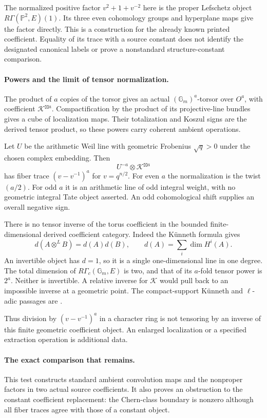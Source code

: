 The normalized positive factor \(v^2+1+v^{-2}\) here is
the proper Lefschetz object
\(R\Gamma(\mathbb P^2,E)(1)\).
Its three even cohomology groups and hyperplane maps give
the factor directly. This is a construction for the already
known printed coefficient. Equality of its trace with a
source constant does not identify the designated canonical
labels or prove a nonstandard structure-constant comparison.

\paragraph{Powers and the limit of tensor normalization.}
The product of \(a\) copies of the torsor gives an actual
\((\mathbb G_m)^a\)-torsor over \(O^a\), with coefficient
\(\mathcal K^{\boxtimes a}\).
Compactification by the product of its projective-line
bundles gives a cube of localization maps. Their totalization
and Koszul signs are the derived tensor product, so these
powers carry coherent ambient operations.

Let \(U\) be the arithmetic Weil line with geometric
Frobenius \(\sqrt q>0\) under the chosen complex embedding.
Then
\[
                   U^{-a}\otimes\mathcal K^{\boxtimes a}
\]
has fiber trace \((v-v^{-1})^a\) for \(v=q^{n/2}\).
For even \(a\) the normalization is the twist \((a/2)\).
For odd \(a\) it is an arithmetic line of odd integral weight,
with no geometric integral Tate object asserted.
An odd cohomological shift supplies an overall negative sign.

There is no tensor inverse of the torus coefficient in the
bounded finite-dimensional derived coefficient category.
Indeed the K\"unneth formula gives
\[
 d(A\otimes^L B)=d(A)d(B),\qquad
 d(A)=\sum_i\dim H^i(A).
\]
An invertible object has \(d=1\), so it is a single
one-dimensional line in one degree.
The total dimension of \(R\Gamma_c(\mathbb G_m,E)\) is two,
and that of its \(a\)-fold tensor power is \(2^a\).
Neither is invertible. A relative inverse for \(\mathcal K\)
would pull back to an impossible inverse at a geometric point.
The compact-support K\"unneth and \(\ell\)-adic passages are
\cite[Theorem~22.1 and Remark~22.3(b)--(d),
pp.~135--136]{Milne}.

Thus division by \((v-v^{-1})^a\) in a character ring is
not tensoring by an inverse of this finite geometric
coefficient object. An enlarged localization or a specified
extraction operation is additional data.

\paragraph{The exact comparison that remains.}
This test constructs standard ambient convolution maps and
the nonproper factors in two actual source coefficients.
It also proves an obstruction to the constant coefficient
replacement: the Chern-class boundary is nonzero although
all fiber traces agree with those of a constant object.

